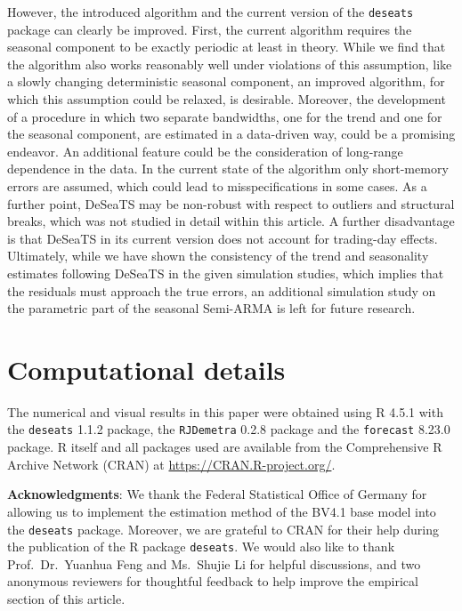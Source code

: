 However, the introduced algorithm and the current version of the \texttt{deseats} package can clearly be improved. First, the current algorithm requires the seasonal component to be exactly periodic at least in theory. While we find that the algorithm also works reasonably well under violations of this assumption, like a slowly changing deterministic seasonal component, an improved algorithm, for which this assumption could be relaxed, is desirable. Moreover, the development of a procedure in which two separate bandwidths, one for the trend and one for the seasonal component, are estimated in a data-driven way, could be a promising endeavor. An additional feature could be the consideration of long-range dependence in the data. In the current state of the algorithm only short-memory errors are assumed, which could lead to misspecifications in some cases. As a further point, DeSeaTS may be non-robust with respect to outliers and structural breaks, which was not studied in detail within this article. A further disadvantage is that DeSeaTS in its current version does not account for trading-day effects. Ultimately, while we have shown the consistency of the trend and seasonality estimates following DeSeaTS in the given simulation studies, which implies that the residuals must approach the true errors, an additional simulation study on the parametric part of the seasonal Semi-ARMA is left for future research.

\section*{Computational details}\label{computational-details}

The numerical and visual results in this paper were obtained using R 4.5.1 with the \texttt{deseats} 1.1.2 package, the \texttt{RJDemetra} 0.2.8 package and the \texttt{forecast} 8.23.0 package. R itself and all packages used are available from the Comprehensive R Archive Network (CRAN) at \url{https://CRAN.R-project.org/}.

\noindent
\textbf{Acknowledgments}: We thank the Federal Statistical Office of Germany for allowing us to implement the estimation method of the BV4.1 base model into the \texttt{deseats} package. Moreover, we are grateful to CRAN for their help during the publication of the R package \texttt{deseats}. We would also like to thank Prof.~Dr.~Yuanhua Feng and Ms.~Shujie Li for helpful discussions, and two anonymous reviewers for thoughtful feedback to help improve the empirical section of this article.

